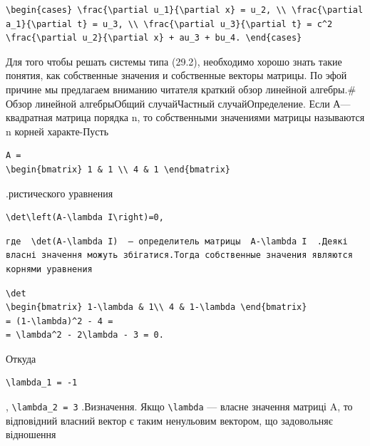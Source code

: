 \documentclass[
  ukrainian,
]{article}
\begin{document}
\begin{verbatim}
\begin{cases} \frac{\partial u_1}{\partial x} = u_2, \\ \frac{\partial a_1}{\partial t} = u_3, \\ \frac{\partial u_3}{\partial t} = c^2 \frac{\partial u_2}{\partial x} + au_3 + bu_4. \end{cases}
\end{verbatim}

Для того чтобы решать системы типа (29.2), необходимо хорошо знать такие
понятия, как собственные значения и собственные векторы матрицы. По эфой
причине мы предлагаем вниманию читателя краткий обзор линейной
алгебры.\# Обзор линейной алгебрыОбщий случайЧастный случайОпределение.
Если А---квадратная матрица порядка n, то собственными значениями
матрицы называются n корней характе-Пусть

\begin{verbatim}
A =
\begin{bmatrix} 1 & 1 \\ 4 & 1 \end{bmatrix}
\end{verbatim}

.ристического уравнения

\begin{verbatim}
\det\left(A-\lambda I\right)=0,
\end{verbatim}

\begin{verbatim}
где  \det(A-\lambda I)  — определитель матрицы  A-\lambda I  .Деякі власні значення можуть збігатися.Тогда собственные значения являются корнями уравнения
\end{verbatim}

\begin{verbatim}
\det
\begin{bmatrix} 1-\lambda & 1\\ 4 & 1-\lambda \end{bmatrix}
= (1-\lambda)^2 - 4 =
= \lambda^2 - 2\lambda - 3 = 0.
\end{verbatim}

Откуда

\begin{verbatim}
\lambda_1 = -1
\end{verbatim}

, \texttt{\textbackslash{}lambda\_2\ =\ 3} .Визначення. Якщо
\texttt{\textbackslash{}lambda} --- власне значення матриці A, то
відповідний власний вектор є таким ненульовим вектором, що задовольняє
відношення
\end{document}
